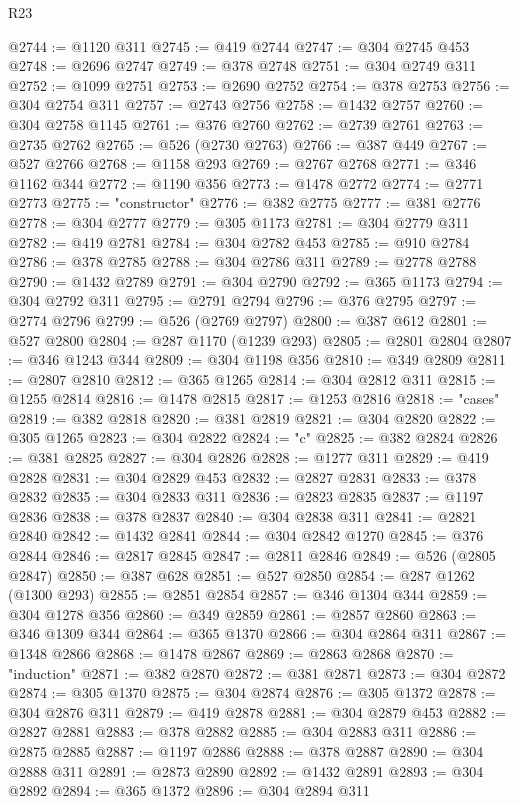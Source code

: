 \begin{lexlean}{R23}
\begin{coremodule}
@2744 := @1120 @311
@2745 := @419 @2744
@2747 := @304 @2745 @453
@2748 := @2696 @2747
@2749 := @378 @2748
@2751 := @304 @2749 @311
@2752 := @1099 @2751
@2753 := @2690 @2752
@2754 := @378 @2753
@2756 := @304 @2754 @311
@2757 := @2743 @2756
@2758 := @1432 @2757
@2760 := @304 @2758 @1145
@2761 := @376 @2760
@2762 := @2739 @2761
@2763 := @2735 @2762
@2765 := @526 (@2730 @2763)
@2766 := @387 @449
@2767 := @527 @2766
@2768 := @1158 @293
@2769 := @2767 @2768
@2771 := @346 @1162 @344
@2772 := @1190 @356
@2773 := @1478 @2772
@2774 := @2771 @2773
@2775 := "constructor"
@2776 := @382 @2775
@2777 := @381 @2776
@2778 := @304 @2777
@2779 := @305 @1173
@2781 := @304 @2779 @311
@2782 := @419 @2781
@2784 := @304 @2782 @453
@2785 := @910 @2784
@2786 := @378 @2785
@2788 := @304 @2786 @311
@2789 := @2778 @2788
@2790 := @1432 @2789
@2791 := @304 @2790
@2792 := @365 @1173
@2794 := @304 @2792 @311
@2795 := @2791 @2794
@2796 := @376 @2795
@2797 := @2774 @2796
@2799 := @526 (@2769 @2797)
@2800 := @387 @612
@2801 := @527 @2800
@2804 := @287 @1170 (@1239 @293)
@2805 := @2801 @2804
@2807 := @346 @1243 @344
@2809 := @304 @1198 @356
@2810 := @349 @2809
@2811 := @2807 @2810
@2812 := @365 @1265
@2814 := @304 @2812 @311
@2815 := @1255 @2814
@2816 := @1478 @2815
@2817 := @1253 @2816
@2818 := "cases"
@2819 := @382 @2818
@2820 := @381 @2819
@2821 := @304 @2820
@2822 := @305 @1265
@2823 := @304 @2822
@2824 := "c"
@2825 := @382 @2824
@2826 := @381 @2825
@2827 := @304 @2826
@2828 := @1277 @311
@2829 := @419 @2828
@2831 := @304 @2829 @453
@2832 := @2827 @2831
@2833 := @378 @2832
@2835 := @304 @2833 @311
@2836 := @2823 @2835
@2837 := @1197 @2836
@2838 := @378 @2837
@2840 := @304 @2838 @311
@2841 := @2821 @2840
@2842 := @1432 @2841
@2844 := @304 @2842 @1270
@2845 := @376 @2844
@2846 := @2817 @2845
@2847 := @2811 @2846
@2849 := @526 (@2805 @2847)
@2850 := @387 @628
@2851 := @527 @2850
@2854 := @287 @1262 (@1300 @293)
@2855 := @2851 @2854
@2857 := @346 @1304 @344
@2859 := @304 @1278 @356
@2860 := @349 @2859
@2861 := @2857 @2860
@2863 := @346 @1309 @344
@2864 := @365 @1370
@2866 := @304 @2864 @311
@2867 := @1348 @2866
@2868 := @1478 @2867
@2869 := @2863 @2868
@2870 := "induction"
@2871 := @382 @2870
@2872 := @381 @2871
@2873 := @304 @2872
@2874 := @305 @1370
@2875 := @304 @2874
@2876 := @305 @1372
@2878 := @304 @2876 @311
@2879 := @419 @2878
@2881 := @304 @2879 @453
@2882 := @2827 @2881
@2883 := @378 @2882
@2885 := @304 @2883 @311
@2886 := @2875 @2885
@2887 := @1197 @2886
@2888 := @378 @2887
@2890 := @304 @2888 @311
@2891 := @2873 @2890
@2892 := @1432 @2891
@2893 := @304 @2892
@2894 := @365 @1372
@2896 := @304 @2894 @311

\end{coremodule}
\end{lexlean}

